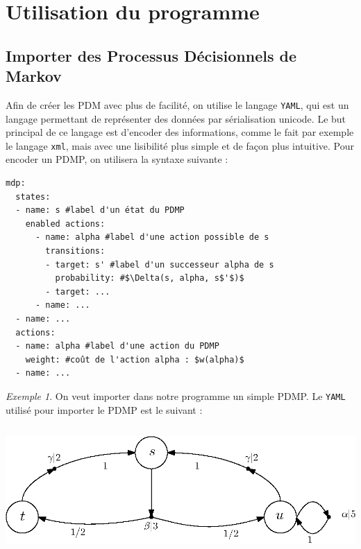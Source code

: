\documentclass[12pt,a4paper]{report}
\theoremstyle{definition}%
\theoremstyle{remark}
\newtheorem{example}{Exemple}[chapter]
\begin{document}
\section{Utilisation du programme}

\subsection{Importer des Processus Décisionnels de Markov}
Afin de créer les PDM avec plus de facilité, on utilise le langage
\verb|YAML|, qui est un langage permettant de représenter des données par
sérialisation unicode. Le but principal de ce langage est d'encoder
des informations, comme le fait par exemple le langage \verb|xml|, mais avec
une lisibilité plus simple et de façon plus intuitive.
Pour encoder un PDMP, on utilisera la syntaxe suivante :

\scriptsize
\begin{verbatim}
mdp:
  states:
  - name: s #label d'un état du PDMP
    enabled actions:
      - name: alpha #label d'une action possible de s
        transitions:
        - target: s' #label d'un successeur alpha de s
          probability: #$\Delta(s, alpha, s$'$)$
        - target: ...
      - name: ...
  - name: ...
  actions:
  - name: alpha #label d'une action du PDMP
    weight: #coût de l'action alpha : $w(alpha)$
  - name: ...
\end{verbatim}
\normalsize
\begin{example} \label{osef-yaml}
	On veut importer dans notre programme un simple PDMP. Le \verb|YAML|
		utilisé pour importer le PDMP est le suivant :

\begin{minipage}[t][][b]{0.35\textwidth}
\scriptsize
\inputminted{yaml}{../ssp/examples/simple_mdp.yaml}
\normalsize
\end{minipage}
\begin{minipage}[t][][b]{0.45\textwidth}
	\vspace{0.55\textwidth}
	\includegraphics[scale=0.75]{figures/sspp1}
	\captionsetup{justification=centering}
	\label{yaml-pdmp}
\end{minipage}
\end{example}
\end{document}
